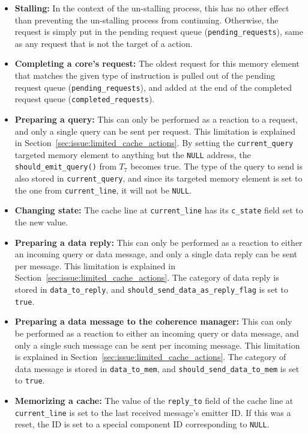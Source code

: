 \begin{itemize}
\item \textbf{Stalling:}
   In the context of the un-stalling process, this has no other effect than
   preventing the un-stalling process from continuing. Otherwise, the request is
   simply put in the pending request queue (\lstinline!pending_requests!), same
   as any request that is not the target of a \hitact{} action.

\item \textbf{Completing a core's request:}
   The oldest request for this memory element that matches the given type of
   instruction is pulled out of the pending request queue
   (\lstinline!pending_requests!), and added at the end of the completed request
   queue (\lstinline!completed_requests!).

\item \textbf{Preparing a query:}
   This can only be performed as a reaction to a request, and only a single
   query can be sent per request. This limitation is explained in
   Section~\ref{sec:issue:limited_cache_actions}.
   By setting the \lstinline!current_query! targeted memory element to anything
   but the \lstinline!NULL! address, the \lstinline{should_emit_query()} from
   $T_7$ becomes true. The type of the query to send is also stored in
   \lstinline!current_query!, and since its targeted memory element is set to
   the one from \lstinline!current_line!, it will not be \lstinline!NULL!.

\item \textbf{Changing state:}
   The cache line at \lstinline!current_line! has its \lstinline!c_state! field
   set to the new value.

\item \textbf{Preparing a data reply:}
   This can only be performed as a reaction to either an incoming query or data
   message, and only a single data reply can be sent per message. This
   limitation is explained in Section~\ref{sec:issue:limited_cache_actions}.
   The category of data reply is stored in \lstinline!data_to_reply!, and
   \lstinline!should_send_data_as_reply_flag! is set to \texttt{true}.

\item \textbf{Preparing a data message to the coherence manager:}
   This can only be performed as a reaction to either an incoming query or data
   message, and only a single such message can be sent per incoming message.
   This limitation is explained in
   Section~\ref{sec:issue:limited_cache_actions}.  The category of data message
   is stored in \lstinline!data_to_mem!, and
   \lstinline!should_send_data_to_mem! is set to \texttt{true}.

\item \textbf{Memorizing a cache:}
   The value of the \lstinline!reply_to! field of the cache line at
   \lstinline!current_line! is set to the last received message's emitter ID.
   If this was a reset, the ID is set to a special component ID corresponding
   to \lstinline!NULL!.
\end{itemize}
